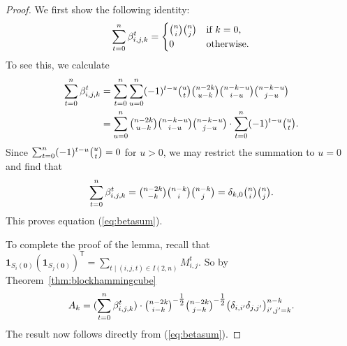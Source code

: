 \documentclass[10pt,a4paper]{article}
\newcommand{\one}{\mathbf{1}}
\theoremstyle{definition}
\newcommand{\zero}{\mathbf{0}}
\newcommand{\T}{^{\mathsf{T}}}
\begin{document}
\begin{proof}
We first show the following identity:
\begin{equation}\label{eq:betasum}
\sum_{t=0}^n\beta_{i,j,k}^t=
\begin{cases}\tbinom{n}{i}\tbinom{n}{j}&\text{if $k=0$,}\\
0&\text{otherwise.}
\end{cases}
\end{equation}
To see this, we calculate
\begin{align*}
\sum_{t=0}^n \beta_{i,j,k}^{t}&=\sum_{t=0}^n \sum_{u=0}^n (-1)^{t-u} \tbinom{u}{t}\tbinom{n-2k}{u-k}\tbinom{n-k-u}{i-u}\tbinom{n-k-u}{j-u}\\
&=\sum_{u=0}^n \tbinom{n-2k}{u-k}\tbinom{n-k-u}{i-u}\tbinom{n-k-u}{j-u}\cdot \sum_{t=0}^n (-1)^{t-u} \tbinom{u}{t}.
\end{align*}
Since $\sum_{t=0}^n (-1)^{t-u} \tbinom{u}{t}=0$ for $u>0$, we may restrict the summation to $u=0$ and find that 
\[
\sum_{t=0}^n \beta_{i,j,k}^{t}=\tbinom{n-2k}{-k}\tbinom{n-k}{i}\tbinom{n-k}{j}=\delta_{k,0}\tbinom{n}{i}\tbinom{n}{j}.
\]
This proves equation (\ref{eq:betasum}). 

To complete the proof of the lemma, recall that $\one_{S_i(\zero)}(\one_{S_j(\zero)})\T=\sum_{t\mid (i,j,t)\in I(2,n)} M_{i,j}^t$. 
So by Theorem~\ref{thm:blockhammingcube}
\[
A_k= (\sum_{t=0}^n \beta_{i,j,k}^{t})\cdot \tbinom{n-2k}{i-k}^{-\tfrac{1}{2}} \tbinom{n-2k}{j-k}^{-\tfrac{1}{2}} \big(\delta_{i,i'}\delta_{j,j'}\big)_{i',j'=k}^{n-k}.
\]
The result now follows directly from (\ref{eq:betasum}).
\end{proof}
\end{document}
